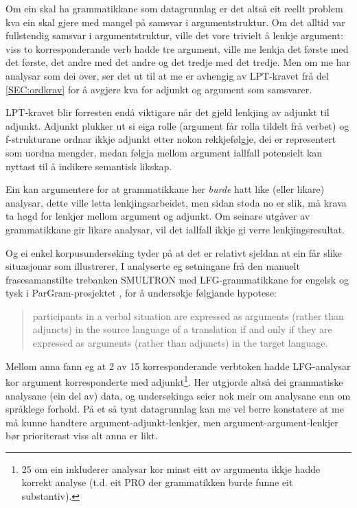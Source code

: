 \documentclass[11pt,a4paper,oneside,draft]{book}
\begin{document}
Om ein skal ha grammatikkane som datagrunnlag er det altså eit reellt
problem kva ein skal gjere med mangel på samsvar i
argumentstruktur. Om det alltid var fullstendig samsvar i
argumentstruktur, ville det vore trivielt å lenkje argument: viss to
korresponderande verb hadde tre argument, ville me lenkja det første
med det første, det andre med det andre og det tredje med det
tredje. Men om me har analysar som dei over, ser det ut til at me er
avhengig av LPT-kravet frå del \ref{SEC:ordkrav} for å avgjere kva for
adjunkt og argument som samsvarer. 

LPT-kravet blir forresten endå viktigare når det gjeld lenkjing av
adjunkt til adjunkt. Adjunkt plukker ut si eiga rolle (argument får
rolla tildelt frå verbet) og f-strukturane ordnar ikkje adjunkt etter
nokon rekkjefølgje, dei er representert som uordna mengder, medan
følgja mellom argument iallfall potensielt kan nyttast til å indikere
semantisk likskap.

Ein kan argumentere for at grammatikkane her \emph{burde} hatt like (eller
likare) analysar, dette ville letta lenkjingsarbeidet, men sidan stoda
no er slik, må krava ta høgd for lenkjer mellom argument og
adjunkt. Om seinare utgåver av grammatikkane gir likare analysar, vil
det iallfall ikkje gi verre lenkjingsresultat.

Og ei enkel korpusundersøking tyder på at det er relativt sjeldan at
ein får slike situasjonar som \Last illustrerer.  I
\citet{unhammer2009aaa} analyserte eg setningane frå den manuelt
frasesamanstilte trebanken SMULTRON \citep{samuelsson2006pap} med
LFG-grammatikkane for engelsk og tysk i ParGram-prosjektet
\citep{butt2002pgp}, for å undersøkje følgjande hypotese:
\begin{quote}
participants in a verbal situation are expressed as
arguments (rather than adjuncts) in the source language of a
translation if and only if they are expressed as arguments (rather
than adjuncts) in the target language.
\end{quote}

Mellom anna fann eg at 2 av 15 korresponderande verbtoken hadde
LFG-analysar kor argument korresponderte med adjunkt\footnote{25 om ein inkluderer analysar kor minst eitt av argumenta
        ikkje hadde korrekt analyse (t.d. eit \textsc{PRO} der
        grammatikken burde funne eit substantiv). }. Her
utgjorde altså dei grammatiske analysane (ein del av) data, og
undersøkinga seier nok meir om analysane enn om språklege forhold. På
et så tynt datagrunnlag kan me vel berre konstatere at me må kunne
handtere argument-adjunkt-lenkjer, men argument-argument-lenkjer bør
prioriterast viss alt anna er likt.
\end{document}
